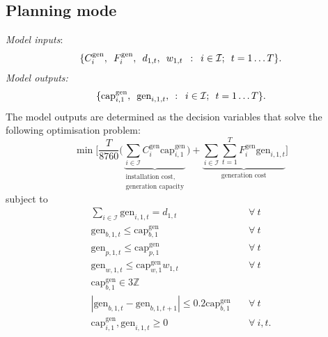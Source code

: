 \documentclass[preprint]{elsarticle}
\begin{document}
\subsection{Planning mode}
\label{sec:appendix:optimisation:model_1}
\noindent \textit{Model inputs}:
\begin{equation}
  \{C_{i}^\text{gen}, \hspace{0.5em} F_{i}^\text{gen}, \hspace{0.5em} d_{1, t}, \hspace{0.5em} w_{1, t} \hspace{0.5em} : \hspace{0.5em} i \in \mathcal{I}; \hspace{0.5em} t = 1 \ldots T\}.
\label{eq:model_1:inputs}
\end{equation}
\textit{Model outputs:}
\begin{equation}
\{\text{cap}_{i,1}^\text{gen}, \hspace{0.5em} \text{gen}_{i,1,t}, \hspace{0.5em} : \hspace{0.5em} i \in \mathcal{I}; \hspace{0.5em} t = 1 \ldots T\}.
\label{eq:model_1:decision_variables}
\end{equation}
The model outputs are determined as the decision variables that solve the following optimisation problem:
\begin{equation}
\min \Bigg[ \frac{T}{8760} \Bigg( \underbrace{\sum_{i \in \mathcal{I}} C_i^\text{gen} \text{cap}_{i,1}^\text{gen}}_{\substack{\text{installation cost,} \\ \text{generation capacity}}} \Bigg) + \underbrace{ \sum_{i \in \mathcal{I}} \sum_{t=1}^{T} F_i^\text{gen} \text{gen}_{i,1,t}}_\text{generation cost} \Bigg]
\label{eq:model_1:objective}
\end{equation}
\noindent subject to
\begin{align}
\sum_{i \in \mathcal{I}} \text{gen}_{i,1,t} = d_{1,t} \quad & \forall \: t \label{eq:model_1:demand_met} \\
\text{gen}_{b,1,t} \le \text{cap}_{b,1}^\text{gen} \quad & \forall \: t \label{eq:model_1:gen_le_cap_b} \\
\text{gen}_{p,1,t} \le \text{cap}_{p,1}^\text{gen} \quad & \forall \: t \label{eq:model_1:gen_le_cap_p} \\
\text{gen}_{w,1,t} \le \text{cap}_{w,1}^\text{gen} w_{1,t} \quad & \forall \: t \label{eq:model_1:gen_le_cap_w} \\
\text{cap}_{b,1}^\text{gen} \in 3\mathbb{Z} \quad & \label{eq:model_1:integer} \\
|\text{gen}_{b,1,t} - \text{gen}_{b,1,t+1}| \le 0.2 \text{cap}_{b,1}^\text{gen} \quad & \forall \: t \label{eq:model_1:ramping} \\
\text{cap}_{i,1}^\text{gen}, \text{gen}_{i,1,t} \ge 0 \quad & \forall \: i, t. \label{eq:model_1:ge_0}
\end{align}
\end{document}
